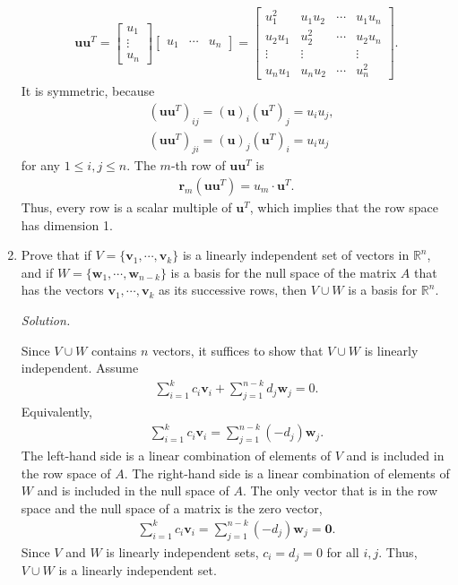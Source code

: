 \documentclass{article}
\begin{document}
\begin{enumerate}
	\begin{align*}
	\mathbf{u}\mathbf{u}^T=\left[\begin{array}{l} u_1\\ \vdots\\ u_n\end{array}\right] \left[ \begin{array}{lll} u_1 & \cdots & u_n\end{array}\right]
	=\left[\begin{array}{llll} u_1^2 & u_1u_2 & \cdots & u_1u_n \\ u_2u_1 & u_2^2& \cdots & u_2u_n \\ \vdots &\vdots & &\vdots \\ u_nu_1& u_nu_2 & \cdots & u_n^2\end{array}\right].	
	\end{align*}
It is symmetric, because
	\begin{align*}
	&\left(\mathbf{u}\mathbf{u}^T\right)_{ij}=(\mathbf{u})_i \left(\mathbf{u}^T	\right)_j=u_iu_j,\\
	&\left(\mathbf{u}\mathbf{u}^T\right)_{ji}=(\mathbf{u})_j \left(\mathbf{u}^T	\right)_i=u_iu_j
	\end{align*}
for any $1\leq i,j\leq n$.
The $m$-th row of $\mathbf{u}\mathbf{u}^T$ is
	\begin{align*}
	\mathbf{r}_m\left(\mathbf{u}\mathbf{u}^T\right)=u_m \cdot \mathbf{u}^T.	
	\end{align*}
Thus, every row is a scalar multiple of $\mathbf{u}^T$, which implies that the row space has dimension 1.


\item
Prove that if $V=\{\mathbf{v}_1,\cdots,\mathbf{v}_k\}$ is a linearly independent set of vectors in $\mathbb{R}^n$, and if $W=\{\mathbf{w}_1,\cdots,\mathbf{w}_{n-k}\}$ is a basis for the null space of the matrix $A$ that has the vectors $\mathbf{v}_1,\cdots,\mathbf{v}_k$ as its successive rows, then 
$V\cup W$ is a basis for $\mathbb{R}^n$.

\emph{Solution.}

Since $V\cup W$ contains $n$ vectors, it suffices to show that $V\cup W$ is linearly independent.
Assume
	\begin{align*}
	\sum_{i=1}^k c_i\mathbf{v}_i+\sum_{j=1}^{n-k}d_j \mathbf{w}_j=0.	
	\end{align*}
Equivalently,
\begin{align*}
	\sum_{i=1}^k c_i\mathbf{v}_i=\sum_{j=1}^{n-k}(-d_j) \mathbf{w}_j.	
	\end{align*}
The left-hand side is a linear combination of elements of $V$ and is included in the row space of $A$.
The right-hand side is a linear combination of elements of $W$ and is included in the null space of $A$.
The only vector that is in the row space and the null space of a matrix is the zero vector, 
	\begin{align*}
	\sum_{i=1}^k c_i\mathbf{v}_i=\sum_{j=1}^{n-k}(-d_j) \mathbf{w}_j=\mathbf{0}.
	\end{align*}
Since $V$ and $W$ is linearly independent sets, $c_i=d_j=0$ for all $i,j$. Thus,
$V\cup W$ is a linearly independent set. 


\end{enumerate}
\end{document}
